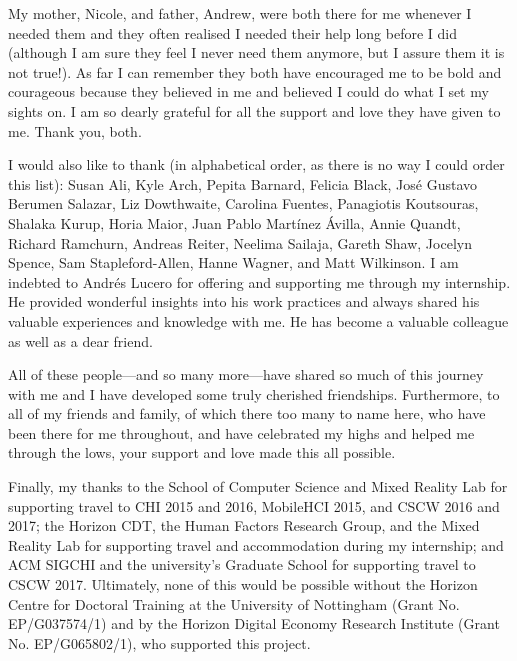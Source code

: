 My mother, Nicole, and father, Andrew, were both there for me whenever I needed them and they often realised I needed their help long before I did (although I am sure they feel I never need them anymore, but I assure them it is not true!).
As far I can remember they both have encouraged me to be bold and courageous because they believed in me and believed I could do what I set my sights on.
I am so dearly grateful for all the support and love they have given to me.
Thank you, both.

I would also like to thank (in alphabetical order, as there is no way I could order this list): Susan Ali, Kyle Arch, Pepita Barnard, Felicia Black, Jos\'{e} Gustavo Berumen Salazar, Liz Dowthwaite, Carolina Fuentes, Panagiotis Koutsouras, Shalaka Kurup, Horia Maior, Juan Pablo Mart\'{i}nez \'{A}villa, Annie Quandt, Richard Ramchurn, Andreas Reiter, Neelima Sailaja, Gareth Shaw, Jocelyn Spence, Sam Staple\-ford-Allen, Hanne Wagner, and Matt Wilkinson.
I am indebted to Andr\'es Lucero for offering and supporting me through my internship.
He provided wonderful insights into his work practices and always shared his valuable experiences and knowledge with me.
He has become a valuable colleague as well as a dear friend.

All of these people---and so many more---have shared so much of this journey with me and I have developed some truly cherished friendships.
Furthermore, to all of my friends and family, of which there too many to name here, who have been there for me throughout, and have celebrated my highs and helped me through the lows, your support and love made this all possible.

Finally, my thanks to the School of Computer Science and Mixed Reality Lab for supporting travel to CHI 2015 and 2016, MobileHCI 2015, and CSCW 2016 and 2017; the Horizon CDT, the Human Factors Research Group, and the Mixed Reality Lab for supporting travel and accommodation during my internship; and ACM SIGCHI and the university's Graduate School for supporting travel to CSCW 2017.
Ultimately, none of this would be possible without the Horizon Centre for Doctoral Training at the University of Nottingham (Grant No. EP/G037574/1) and by the Horizon Digital Economy Research Institute (Grant No. EP/G065802/1), who supported this project.




